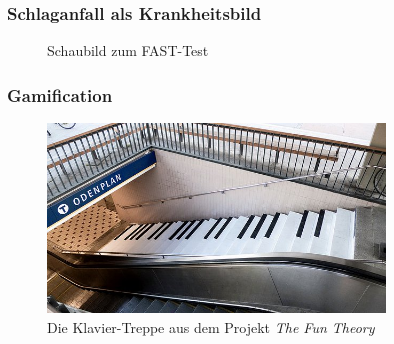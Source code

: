 \renewcommand{\thesubsection}{\arabic{subsection}}
\setcounter{subsection}{2}
\tocless\subsubsection{Schlaganfall als Krankheitsbild}
\begin{figure}[H]
\centering

\caption{Schaubild zum FAST-Test}
\label{fig:fasttest}
\end{figure}

\setcounter{subsection}{3}
\setcounter{subsubsection}{0}
\tocless\subsubsection{Gamification}
\begin{figure}[H]
\centering
\includegraphics[width=0.8\textwidth]{pics/pianostairs.jpg}
\caption{Die Klavier-Treppe aus dem Projekt \emph{The Fun Theory}}
\label{fig:pianostairs}
\end{figure}


